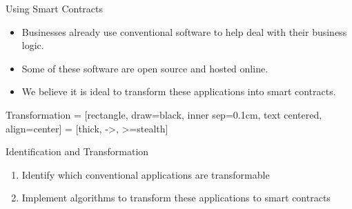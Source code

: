 \documentclass[xcolor=svgnames]{beamer}
\begin{document}
\begin{frame}{Using Smart Contracts}

\begin{itemize}
\item Businesses already use conventional software to help deal with their business logic.
\item Some of these software are open source and hosted online.
\item We believe it is ideal to transform these applications into smart contracts.
\end{itemize}

\end{frame}

\begin{frame}[t]{Transformation}
 = [rectangle, draw=black, inner sep=0.1cm, text centered, align=center]
 = [thick, ->, >=stealth]

\begin{figure}
\centering

\end{figure}



\end{frame}


\begin{frame}{Identification and Transformation}

\begin{enumerate}
\item Identify which conventional applications are transformable

\item Implement algorithms to transform these applications to smart contracts
\end{enumerate}
\end{frame}
\end{document}
